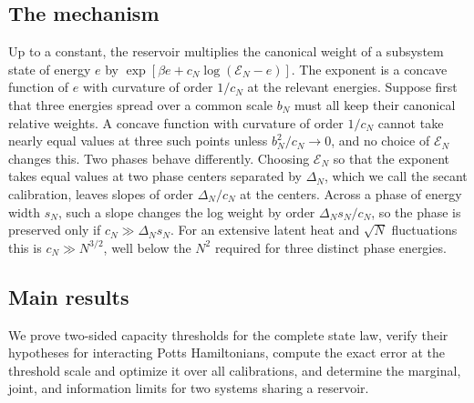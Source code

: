 \subsection{The mechanism}

Up to a constant, the reservoir multiplies the canonical weight of a
subsystem state of energy $e$ by
$\exp[\beta e+c_N\log(\mathcal E_N-e)]$. The exponent is a concave
function of $e$ with curvature of order $1/c_N$ at the relevant
energies. Suppose first that three energies spread over a common scale
$b_N$ must all keep their canonical relative weights. A concave function
with curvature of order $1/c_N$ cannot take nearly equal values at three
such points unless $b_N^2/c_N\to0$, and no choice of $\mathcal E_N$
changes this. Two phases behave differently. Choosing $\mathcal E_N$ so
that the exponent takes equal values at two phase centers separated by
$\Delta_N$, which we call the secant calibration, leaves slopes of order
$\Delta_N/c_N$ at the centers. Across a phase of energy width $s_N$,
such a slope changes the log weight by order $\Delta_Ns_N/c_N$, so the
phase is preserved only if $c_N\gg\Delta_Ns_N$. For an extensive latent
heat and $\sqrt N$ fluctuations this is $c_N\gg N^{3/2}$, well below the
$N^2$ required for three distinct phase energies.

\subsection{Main results}

We prove two-sided capacity thresholds for the complete state law,
verify their hypotheses for interacting Potts Hamiltonians, compute the
exact error at the threshold scale and optimize it over all
calibrations, and determine the marginal, joint, and information limits
for two systems sharing a reservoir.

